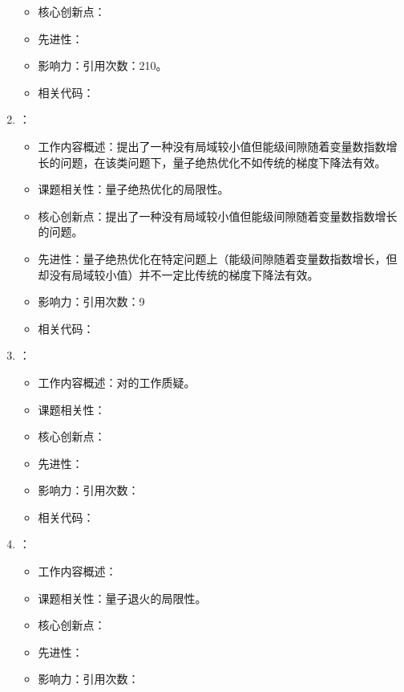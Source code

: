 \begin{enumerate}
\begin{itemize}
                \item 核心创新点：
                \item 先进性：
                \item 影响力：引用次数：210。
                \item 相关代码：
            \end{itemize}
            \item \citet{jarret2015adiabatic}：
            \begin{itemize}
                \item 工作内容概述：提出了一种没有局域较小值但能级间隙随着变量数指数增长的问题，在该类问题下，量子绝热优化不如传统的梯度下降法有效。
                \item 课题相关性：量子绝热优化的局限性。
                \item 核心创新点：提出了一种没有局域较小值但能级间隙随着变量数指数增长的问题。
                \item 先进性：量子绝热优化在特定问题上（能级间隙随着变量数指数增长，但却没有局域较小值）并不一定比传统的梯度下降法有效。
                \item 影响力：引用次数：9
                \item 相关代码：
            \end{itemize}
            \item \citet{liu2015quantum}：
            \begin{itemize}
                \item 工作内容概述：对\citet{boixo2014evidence}的工作质疑。
                \item 课题相关性：
                \item 核心创新点：
                \item 先进性：
                \item 影响力：引用次数：
                \item 相关代码：
            \end{itemize}
            \item \citet{knysh2016zero}：
            \begin{itemize}
                \item 工作内容概述：
                \item 课题相关性：量子退火的局限性。
                \item 核心创新点：
                \item 先进性：
                \item 影响力：引用次数：

\end{itemize}
\end{enumerate}
